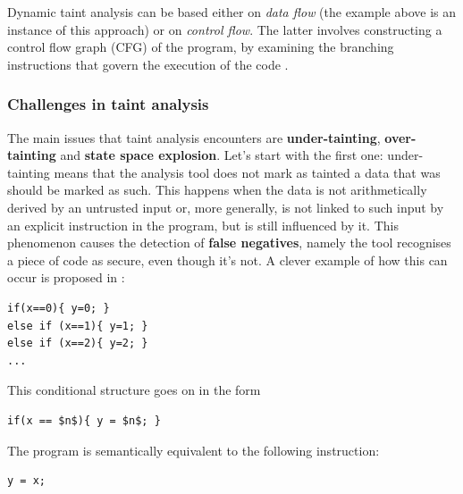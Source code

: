 \documentclass[12pt,a4paper]{book}
\theoremstyle{definition}
\begin{document}
	Dynamic taint analysis can be based either on \textit{data flow} (the example above is an instance of this approach) or on \textit{control flow}. The latter involves constructing a control flow graph (CFG) of the program, by examining the branching instructions that govern the execution of the code \cite{Dai2018}.
	
	\subsubsection{Challenges in taint analysis}
	The main issues that taint analysis encounters are \textbf{under-tainting}, \textbf{over-tainting} and \textbf{state space explosion}. Let's start with the first one: under-tainting means that the analysis tool does not mark as tainted a data that was should be marked as such. This happens when the data is not arithmetically derived by an untrusted input or, more generally, is not linked to such input by an explicit instruction in the program, but is still influenced by it. This phenomenon causes the detection of \textbf{false negatives}, namely the tool recognises a piece of code as secure, even though it's not. A clever example of how this can occur is proposed in \cite{Newsome2005}:
	
	\vspace{3mm}
	\begin{minipage}{.4\textwidth}
	\begin{lstlisting}
if(x==0){ y=0; } 
else if (x==1){ y=1; } 
else if (x==2){ y=2; } 
...
	\end{lstlisting}
	\end{minipage}

	This conditional structure goes on in the form
	
	\vspace{3mm}
	\begin{minipage}{.3\textwidth}
	\begin{lstlisting}[mathescape=true]
if(x == $n$){ y = $n$; }
	\end{lstlisting}
	\end{minipage}

	The program is semantically equivalent to the following instruction:
	
	\vspace{3mm}
	\begin{minipage}{.15\textwidth}
	\begin{lstlisting}
y = x;
	\end{lstlisting}
	\end{minipage}
\end{document}
